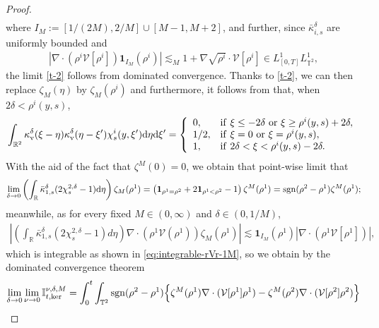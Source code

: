 \begin{proof}
\begin{align*}
\end{align*}
where $I_M := [1/(2M),2/M] \cup [M-1,M+2]$, and further, since $\bar{\kappa}^{\delta}_{i,s}$ are uniformly bounded and
\begin{align}\label{eq:integrable-rVr-1M}
\left|\nabla\cdot\left(\rho^i \mathcal{V}[\rho^i]\right)\mathbf{1}_{I_{M}}(\rho^i)\right| \lesssim_M 1 + \nabla \sqrt{\rho^i} \cdot \mathcal{V}[\rho^i] \in L^1_{[0,T]}L^1_{\mathbb{T}^2},
\end{align}
the limit \eqref{t-2} follows from dominated convergence. Thanks to \eqref{t-2}, we can then replace $\zeta_M(\eta)$ by $\zeta_M(\rho^i)$ and furthermore, it follows from \cite[(4.30)]{FG21} that, when $2\delta<\rho^i(y,s)$,  
\begin{align*}
\int_{\mathbb{R}^2}\kappa_{\mathrm{v}}^{\delta}(\xi-\eta)\kappa_{\mathrm{v}}^{\delta}(\eta-\xi')\chi^{i}_s(y,\xi')\mathrm{d}\eta \mathrm{d}\xi' = \left\{
  \begin{array}{ll}
   0, & {\rm{if}}\ \xi\leq -2\delta\ {\rm{or}}\ \xi\geq \rho^i(y,s)+2\delta, \\
    1/2, & {\rm{if}}\ \xi=0\ {\rm{or}}\ \xi = \rho^i(y,s), \\
    1, & {\rm{if}}\ 2\delta<\xi< \rho^i(y,s)-2\delta.
  \end{array}
\right.
\end{align*}
With the aid of the fact that $\zeta^M(0)=0$, we obtain that point-wise limit that
\begin{align}\label{t-4}
  \lim_{\delta\rightarrow 0}\left(\int_{\mathbb{R}}\bar{\kappa}^{\delta}_{1,s}(2\chi^{2,\delta}_s-1)\mathrm{d}\eta\right)\zeta_M(\rho^1)
  = \left(\mathbf{1}_{\rho^1=\rho^2}+2\mathbf{1}_{\rho^1<\rho^2}-1\right)\zeta^M(\rho^1) = \operatorname{sgn}(\rho^2 - \rho^1)\zeta^M(\rho^1);
\end{align}
meanwhile, as for every fixed $M\in(0,\infty)$ and $\delta\in(0,1/M)$, 
\begin{align*}
\left|\left(\int_{\mathbb{R}}\bar{\kappa}^{\delta}_{1,s}(2\chi^{2,\delta}_s-1)d\eta\right)\nabla\cdot
(\rho^1\mathcal{V}(\rho^1)) \zeta_M(\rho^1)\right| \lesssim \mathbf{1}_{I_M}(\rho^1) \left|\nabla\cdot
(\rho^1\mathcal{V}[\rho^1])\right|,
\end{align*}
which is integrable as shown in \eqref{eq:integrable-rVr-1M}, so we obtain by the dominated convergence theorem
\begin{align}
\lim_{\delta\rightarrow 0} \lim_{\nu\rightarrow 0}\mathbb{I}^{\nu,\delta,M}_{t,\mathrm{ker}} & = \int^t_0\int_{\mathbb{T}^2} \sgn(\rho^2 - \rho^1) \Big\{ \zeta^M(\rho^1) \nabla\cdot(\mathcal{V}[\rho^1]\rho^1) - \zeta^M(\rho^2) \nabla\cdot(\mathcal{V}[\rho^2]\rho^2)\Big\}\nonumber\\

\end{align}
\end{proof}
